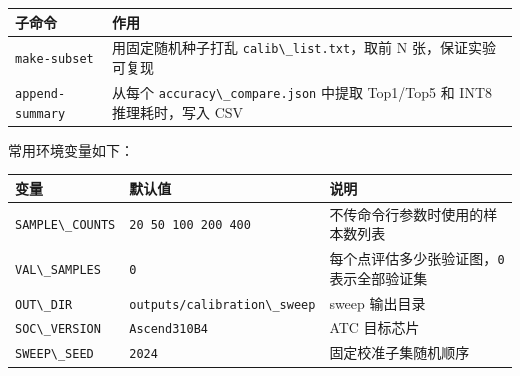 \begin{longtable}[]{@{}
  >{\raggedright\arraybackslash}p{}
  >{\raggedright\arraybackslash}p{}@{}}
\toprule\noalign{}
\begin{minipage}[b]{\linewidth}\raggedright
子命令
\end{minipage} & \begin{minipage}[b]{\linewidth}\raggedright
作用
\end{minipage} \\
\midrule\noalign{}
\endhead
\bottomrule\noalign{}
\endlastfoot
\passthrough{\lstinline!make-subset!} & 用固定随机种子打乱
\passthrough{\lstinline!calib\_list.txt!}，取前 N 张，保证实验可复现 \\
\passthrough{\lstinline!append-summary!} & 从每个
\passthrough{\lstinline!accuracy\_compare.json!} 中提取 Top1/Top5 和
INT8 推理耗时，写入 CSV \\
\end{longtable}

常用环境变量如下：

\begin{longtable}[]{@{}
  >{\raggedright\arraybackslash}p{}
  >{\raggedright\arraybackslash}p{}
  >{\raggedright\arraybackslash}p{}@{}}
\toprule\noalign{}
\begin{minipage}[b]{\linewidth}\raggedright
变量
\end{minipage} & \begin{minipage}[b]{\linewidth}\raggedright
默认值
\end{minipage} & \begin{minipage}[b]{\linewidth}\raggedright
说明
\end{minipage} \\
\midrule\noalign{}
\endhead
\bottomrule\noalign{}
\endlastfoot
\passthrough{\lstinline!SAMPLE\_COUNTS!} &
\passthrough{\lstinline!20 50 100 200 400!} &
不传命令行参数时使用的样本数列表 \\
\passthrough{\lstinline!VAL\_SAMPLES!} & \passthrough{\lstinline!0!} &
每个点评估多少张验证图，\passthrough{\lstinline!0!} 表示全部验证集 \\
\passthrough{\lstinline!OUT\_DIR!} &
\passthrough{\lstinline!outputs/calibration\_sweep!} & sweep 输出目录 \\
\passthrough{\lstinline!SOC\_VERSION!} &
\passthrough{\lstinline!Ascend310B4!} & ATC 目标芯片 \\
\passthrough{\lstinline!SWEEP\_SEED!} & \passthrough{\lstinline!2024!} &
固定校准子集随机顺序 \\
\end{longtable}

